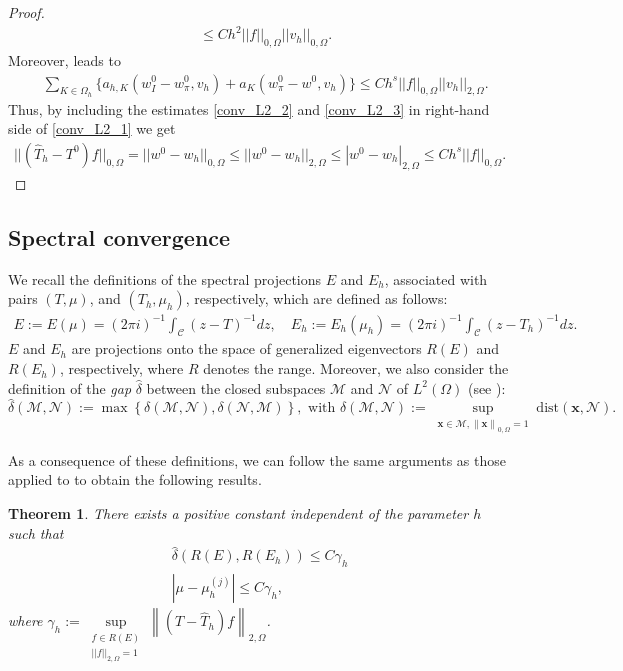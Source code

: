 \documentclass[final,reqno]{elsarticle}
\newtheorem{theorem}{Theorem}[section]
\def\O{\Omega}
\begin{document}
\begin{proof}
\begin{align}
&\leq Ch^2||f ||_{0,\Omega}||v_h ||_{0,\Omega}\label{conv_L2_2}.
\end{align}
%
%
Moreover, \cite[Theorem~5.1]{DV_camwa2022} leads to
\begin{align}
&\sum\limits_{K\in \Omega_h} \Big\{ a_{h,K}(w_I^0-w_{\pi}^0,v_h) +a_K(w_\pi^0-w^0,v_h) \Big\}\leq Ch^s||f||_{0,\O}||v_h ||_{2,\O}.\label{conv_L2_3}
\end{align}
Thus, by including the estimates  \eqref{conv_L2_2} and \eqref{conv_L2_3} in right-hand side of \eqref{conv_L2_1} we get
\begin{align}\label{eq_conv_h2}
|| (\widehat{T}_h- T^0)f||_{0,\O}=||w^0-w_h ||_{0,\O}\leq||w^0-w_h ||_{2,\O}\leq |w^0-w_h|_{2,\O}\leq Ch^s|| f||_{0,\O}.
\end{align}
\end{proof}
\subsection{Spectral convergence}
We recall the definitions of the spectral projections $E$ and $E_h$, associated with pairs $(T,\mu)$,  and  $(T_h,\mu_h)$, respectively, which are defined as follows:
\begin{align*}
E:=E(\mu)=(2\pi i)^{-1}\int_{\mathcal{C}} (z-T)^{-1}dz,
\quad 
E_h:=E_h(\mu_h)=(2\pi i)^{-1}\int_{\mathcal{C}} (z-T_h)^{-1}dz.
\end{align*}
$E$ and $E_h$ are projections onto the space of generalized eigenvectors $R(E)$ and $R(E_h)$, respectively, where $R$ denotes the range. Moreover, we also consider the definition of the \textit{gap} $\hat{\delta}$ between the closed subspaces $\mathcal{M}$ and $\mathcal{N}$ of $L^2(\Omega)$ (see \cite[Chapter~II, Section~6]{BO}):
$$
\widehat{\delta}(\mathcal{M},\mathcal{N}) :=\max\left\{\delta(\mathcal{M},\mathcal{N}),\delta(\mathcal{N},\mathcal{M})\right\}, \text{ with }
\delta(\mathcal{M},\mathcal{N})
:=\sup_{\substack{\mathbf{x}\in\mathcal{M}, \left\|\mathbf{x}\right\|_{ 0,\Omega}=1}}
 \mathrm{dist}(\mathbf{x},\mathcal{N}).
 $$



As a consequence of these definitions, we can follow the same arguments as those applied to \cite[Section~5]{DV_camwa2022} to obtain the following results.

\begin{theorem}
    There exists a positive constant independent of the parameter $h$ such that
    \begin{subequations}
        \begin{align}
            \widehat{\delta}(R(E),R(E_h)) \leq C\gamma_h \nonumber\\
            |\mu-\mu_h^{(j)}|\leq C \gamma_h\nonumber,
        \end{align}
    \end{subequations}
    where 
 $\gamma_h:=\sup\limits_{\substack{f\in R(E)\\||f||_{2,\Omega}= 1}}\left\|(T -\widehat{T}_{h})f\right\|_{2,\Omega}$. 
\end{theorem}
\end{document}
